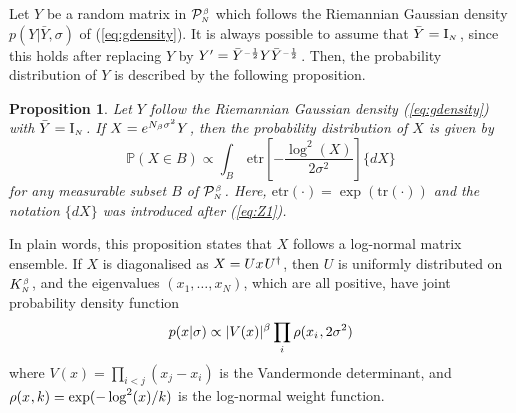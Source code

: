 \documentclass[draftclsnofoot]{IEEEtran}
\newtheorem{prop}{Proposition}
\begin{document}
Let $Y$ be a random matrix in $\mathcal{P}^{\hspace{0.02cm}\scriptscriptstyle \beta}_{\scriptscriptstyle N}$ which follows the Riemannian Gaussian density $p(Y|\bar{Y},\sigma)$ of (\ref{eq:gdensity}). It is always possible to assume that $\bar{Y} = \mathrm{I}_{\scriptscriptstyle N}\hspace{0.03cm}$, since this holds after replacing $Y$ by $Y^\prime = \bar{Y}^{\scriptscriptstyle -\frac{1}{2}}Y\bar{Y}^{\scriptscriptstyle -\frac{1}{2}}\hspace{0.03cm}$. Then, the probability distribution of $Y$ is described by the following proposition.
\begin{prop} \label{prop:log-normal}
 Let $Y$ follow the Riemannian Gaussian density (\ref{eq:gdensity}) with $\bar{Y} = \mathrm{I}_{\scriptscriptstyle N}\hspace{0.03cm}$. If $X = e^{N_\beta\sigma^2}\hspace{0.02cm}Y$, then the probability distribution of $X$ is given by
 \begin{equation} \label{eq:lognormal1}
   \mathbb{P}(X\in B) \propto \int_B\,\mathrm{etr}\left[-\frac{\log^2(X)}{2\sigma^2}\right]\lbrace dX\rbrace  
 \end{equation}
 for any measurable subset $B$ of $\mathcal{P}^{\hspace{0.02cm}\scriptscriptstyle \beta}_{\scriptscriptstyle N\hspace{0.03cm}}$. Here, $\mathrm{etr}(\cdot) = \exp(\mathrm{tr}(\cdot))$ and the notation $\lbrace dX\rbrace$ was introduced after (\ref{eq:Z1}).  
\end{prop}
In plain words, this proposition states that $X$ follows a log-normal matrix ensemble. If $X$ is diagonalised as $X = Ux\hspace{0.03cm}U^\dagger$, then $U$ is uniformly distributed on $K^{\hspace{0.02cm}\scriptscriptstyle \beta}_{\scriptscriptstyle N\hspace{0.02cm}}$, and the eigenvalues $(x_{\scriptscriptstyle 1},\ldots,x_{\scriptscriptstyle N})$, which are all positive, have joint probability density function
\begin{equation} \label{eq:lognormal2}
  p(x|\sigma) \propto |V(x)|^\beta\prod_i \rho(x_i\hspace{0.02cm},2\sigma^2) 
\end{equation}
where $V(x) = \prod_{i<j}(x_j-x_i)$ is the Vandermonde determinant, and $\rho(x\hspace{0.02cm},k) = \exp(-\log^2(x)/k)$ is the log-normal weight function.
\end{document}
